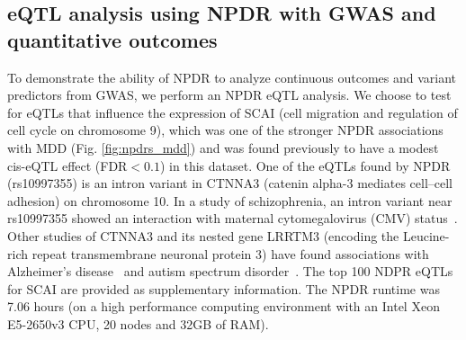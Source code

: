 \documentclass[10pt]{article}
\begin{document}
% 

\subsection{eQTL analysis using NPDR with GWAS and quantitative outcomes}

To demonstrate the ability of NPDR to analyze continuous outcomes and variant predictors from GWAS, we perform an NPDR eQTL analysis.
We choose to test for eQTLs that influence the expression of SCAI (cell migration and regulation of cell cycle on chromosome 9), which was one of the stronger NPDR associations with MDD (Fig. \ref{fig:npdrs_mdd}) and was found previously to have a modest cis-eQTL effect (FDR$<0.1$) in this dataset\cite{mostafavi14}.
One of the eQTLs found by NPDR (rs10997355) is an intron variant in CTNNA3 (catenin alpha-3 mediates cell–cell adhesion) on chromosome 10.
In a study of schizophrenia, an intron variant near rs10997355 showed an interaction with maternal cytomegalovirus (CMV) status~\cite{borglum2014genome}.
Other studies of CTNNA3 and its nested gene LRRTM3 (encoding the Leucine-rich repeat transmembrane neuronal protein 3) have found associations with Alzheimer's disease~\cite{miyashita2007genetic} and autism spectrum disorder~\cite{wang2009common}.
The top 100 NDPR eQTLs for SCAI are provided as supplementary information.
The NPDR runtime was 7.06 hours (on a high performance computing environment with an Intel Xeon E5-2650v3 CPU, 20 nodes and 32GB of RAM).
\end{document}
